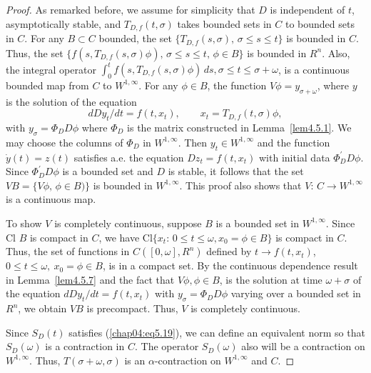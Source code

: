 \documentclass{surv-l}
\theoremstyle{plain}
\theoremstyle{definition}
\numberwithin{equation}{section}
\numberwithin{figure}{chapter}
\begin{document}
\begin{proof}
\noindent As remarked before, we assume for simplicity that $D$ is independent of $t$, asymptotically stable, and $T_{D,f}(t, \sigma)$ takes bounded sets in $C$ to bounded sets in $C$. For any $B\subset C$ bounded, the set $\{T_{D,f}(s, \sigma),\, \sigma\leq s\leq t\}$ is bounded in $C$. Thus, the set $\{f(s, T_{D,f}(s, \sigma)\phi),\, \sigma\leq s\leq t,\, \phi \in B\}$ is bounded in $R^{n}$. Also, the integral operator $\int_{0}^{t}f(s, T_{D,f}(s, \sigma)\phi)\,ds, \sigma\leq t\leq\sigma+\omega$, is a continuous bounded map from $C$ to $W^{1,\infty}$. For any $\phi\in B$, the function $V\phi=y_{\sigma+\omega}$, where $y$ is the solution of the equation
\begin{equation*}
dDy_{t}/dt = f(t, x_{t}),\qquad x_{t}=T_{D,f}(t, \sigma)\phi,
\end{equation*}
with $y_{\sigma}=\Phi_{D}D\phi$ where $\Phi_{D}$ is the matrix constructed in Lemma~\ref{lem4.5.1}. We may choose the columns of $\Phi_{D}$ in $W^{1,\infty}$. Then $y_{t}\in W^{1,\infty}$ and the function $\dot{y}(t)=z(t)$ satisfies a.e. the equation $Dz_{t}=f(t, x_{t})$ with initial data $\Phi_{D}^{\prime}D\phi$. Since $\Phi_{D}^{\prime}D\phi$ is a bounded set and $D$ is stable, it follows that the set $V B=\{V\phi,\, \phi\in B)\}$ is bounded in $W^{1,\infty}$. This proof also shows that $V:\,C\rightarrow W^{1,\infty}$ is a continuous map.

To show $V$ is completely continuous, suppose $B$ is a bounded set in $W^{1,\infty}$. Since Cl $B$ is compact in $C$, we have Cl$\{x_{t}:\,0\leq t\leq\omega, x_{0}=\phi\in B\}$ is compact in $C$. Thus, the set of functions in $C([0, \omega], R^{n})$ defined by $t\rightarrow f(t, x_{t})$, $0\leq t\leq\omega,\ x_{0}=\phi \in B$, is in a compact set. By the continuous dependence result in Lemma~\ref{lem4.5.7} and the fact that $V\phi, \phi\in B$, is the solution at time $\omega+\sigma$ of the equation $dDy_{t}/dt=f(t, x_{t})$ with $y_{\sigma}=\Phi_{D}D\phi$ varying over a bounded set in $R^{n}$, we obtain $V B$ is precompact. Thus, $V$ is completely continuous.

Since $S_{D}(t)$ satisfies (\ref{chap04:eq5.19}), we can define an equivalent norm so that $S_{D}(\omega)$ is a contraction in $C$. The operator $S_{D}(\omega)$ also will be a contraction on $W^{1,\infty}$. Thus, $T(\sigma+\omega, \sigma)$ is an $\alpha$-contraction on $W^{1,\infty}$ and $C$.


\end{proof}
\end{document}
